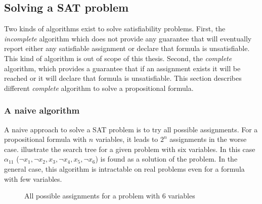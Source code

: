 \subsection{Solving a SAT problem}
Two kinds of algorithms exist to solve satisfiability problems.
First, the \emph{incomplete} algorithm which does not provide any guarantee that will eventually report either any satisfiable assignment or declare that formula is unsatisfiable. This kind of algorithm is out of scope of this thesis. 
Second, the \emph{complete} algorithm, which provides a guarantee that if an assignment exists
it will be reached or it will declare that formula is unsatisfiable.
This section describes different \emph{complete }algorithm to solve a propositional formula.

\subsubsection{A naive algorithm}
A naive approach to solve a SAT problem is to try all possible assignments.
For a propositional formula with $n$ variables, it leads to $2^n$ assignments in the worse case.  
 illustrate the search tree for a given problem with six variables.
In this case $\alpha_{11}$ ($\neg x_1, \neg x_2, x_3, \neg x_4, x_5, \neg x_6 $) is found as a solution of the problem. In the general case,
this algorithm is  intractable on real problems even for a formula with few variables.

\begin{figure}[!htbp]
 \centering
 
 \caption{All possible assignments for a problem with 6 variables}
 \label{fig:naive_algo}
\end{figure}


